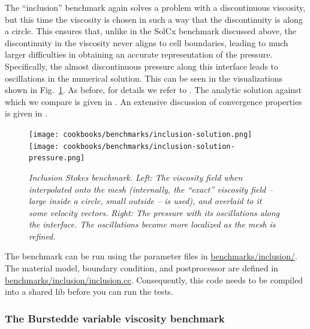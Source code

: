 \documentclass{article}
\begin{document}
The ``inclusion'' benchmark again solves a problem with a discontinuous
viscosity, but this time the viscosity is chosen in such a way that the
discontinuity is along a circle. This ensures that, unlike in the SolCx
benchmark discussed above, the discontinuity in the viscosity never aligns to
cell boundaries, leading to much larger difficulties in obtaining an accurate
representation of the pressure. Specifically, the almost discontinuous
pressure along this interface leads to oscillations in the numerical
solution. This can be seen in the visualizations shown in
Fig.~\ref{fig:inclusion}. As before, for details we refer to
\cite{DMGT11}. The analytic solution against which we compare is given in
\cite{SP03}. An extensive discussion of convergence properties is given in
\cite{KHB12}.

\begin{figure}
  \begin{center}
    \texttt{[image: cookbooks/benchmarks/inclusion-solution.png]}
    \hfill
    \texttt{[image: cookbooks/benchmarks/inclusion-solution-pressure.png]}
    \caption{\it Inclusion Stokes benchmark. Left: The viscosity field
      when interpolated onto the mesh (internally, the ``exact'' viscosity
      field -- large inside a circle, small outside -- is used),
      and overlaid to it some velocity vectors. Right: The
      pressure with its oscillations along the interface. The oscillations
      become more localized as the mesh is refined.}
    \label{fig:inclusion}
  \end{center}
\end{figure}

The benchmark can be run using the parameter files in \url{benchmarks/inclusion/}. The material model, boundary condition, and postprocessor are defined in \url{benchmarks/inclusion/inclusion.cc}. Consequently, this code needs to be compiled into a shared lib before you can run the tests.







\subsubsection{The Burstedde variable viscosity benchmark}
\label{sec:benchmark-burstedde}
\end{document}
